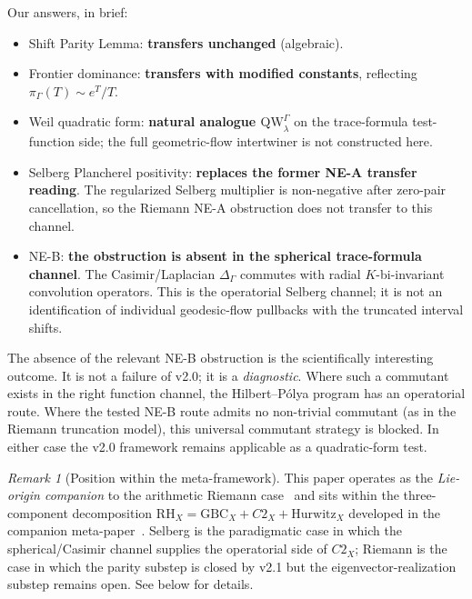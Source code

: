 \documentclass[12pt,a4paper]{article}
\theoremstyle{definition}
\theoremstyle{remark}
\newtheorem{remark}[theorem]{Remark}
\newcommand{\QW}{\mathrm{QW}}
\newcommand{\Delop}{\Delta_{\Gamma}}
\begin{document}
\medskip
Our answers, in brief:

\begin{itemize}
\item Shift Parity Lemma: \textbf{transfers unchanged} (algebraic).
\item Frontier dominance: \textbf{transfers with modified constants},
reflecting $\pi_\Gamma(T) \sim e^T/T$.
\item Weil quadratic form: \textbf{natural analogue $\QW^\Gamma_\lambda$} on
the trace-formula test-function side; the full geometric-flow intertwiner is
not constructed here.
\item Selberg Plancherel positivity: \textbf{replaces the former NE-A
transfer reading}. The regularized Selberg multiplier is non-negative after
zero-pair cancellation, so the Riemann NE-A obstruction does not transfer to
this channel.
\item NE-B: \textbf{the obstruction is absent in the spherical trace-formula
channel}. The Casimir/Laplacian $\Delop$ commutes with radial
$K$-bi-invariant convolution operators. This is the operatorial Selberg
channel; it is not an identification of individual geodesic-flow pullbacks with
the truncated interval shifts.
\end{itemize}

The absence of the relevant NE-B obstruction is the scientifically interesting
outcome. It is not a failure of v2.0; it is a \emph{diagnostic}. Where such a
commutant exists in the right function channel, the Hilbert--Pólya program
has an operatorial route. Where the tested NE-B route admits no non-trivial
commutant (as in the Riemann truncation model), this universal commutant
strategy is blocked. In either case the v2.0 framework remains applicable as a
quadratic-form test.

\begin{remark}[Position within the meta-framework]
This paper operates as the \emph{Lie-origin companion} to the arithmetic
Riemann case~\cite{Geiger2026partII} and sits within the three-component
decomposition $\mathrm{RH}_X = \mathrm{GBC}_X + C2_X + \mathrm{Hurwitz}_X$
developed in the companion meta-paper~\cite{GeigerMeta2026}. Selberg
is the paradigmatic case in which the spherical/Casimir channel supplies the
operatorial side of $C2_X$; Riemann is the case in which
the parity substep is closed by v2.1 but the eigenvector-realization
substep remains open. See  below for
details.
\end{remark}
\end{document}
